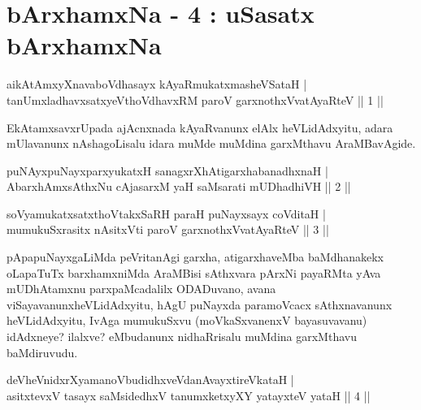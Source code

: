
\chapter{bArxhamxNa - 4 : uSasatx bArxhamxNa}

\begin{shl}
aikAtAmxyXnavaboVdhasayx kAyaRmukatxmasheVSataH |\\
tanUmxladhavxsatxyeV\s thoVdhavxRM paroV garxnothxV\s vatAyaRteV \hfill || 1 ||
\end{shl}

\begin{artha}
EkAtamxsavxrUpada ajAcnxnada kAyaRvanunx elAlx heVLidAdxyitu, adara mUlavanunx nAshagoLisalu idara muMde muMdina garxMthavu AraMBavAgide.
\end{artha}

\begin{shl}
puNAyxpuNayxparxyukatxH sanagxrXhAtigarxhabanadhxnaH |\\
AbarxhAmx\s \s sAthxNu cAjasarxM yaH saMsarati mUDhadhiVH \hfill || 2 ||
\end{shl}

\begin{shl}
soV\s yamukatxsatxthoVtakxSaRH paraH puNayxsayx coVditaH |\\
mumukuSxrasitx nAsitxVti paroV garxnothxV\s vatAyaRteV \hfill || 3 ||
\end{shl}

\begin{artha}
pApapuNayxgaLiMda peVritanAgi garxha, atigarxhaveMba baMdhanakekx oLapaTuTx barxhamxniMda AraMBisi sAthxvara pArxNi payaRMta yAva mUDhAtamxnu parxpaMcadalilx ODADuvano, avana viSayavanunx\break heVLidAdxyitu, hAgU puNayxda paramoVcacx sAthxnavanunx heVLidAdxyitu, IvAga mumukuSxvu (moVkaSxvanenxV bayasuvavanu) idAdxneye? ilalxve? eMbudanunx nidhaRrisalu muMdina garxMthavu baMdiruvudu.
\end{artha}


\begin{shl}
deVheVnidxrXyamanoVbudidhxveVdanAvayxtireVkataH |\\
asitxtevxV tasayx saMsidedhxV tanumxketxyXY yatayxteV yataH \hfill || 4 ||
\end{shl}

